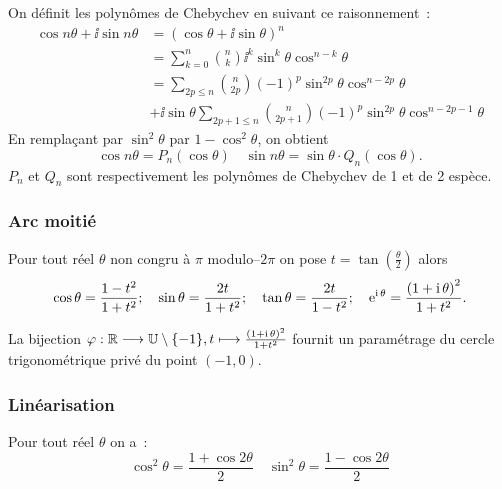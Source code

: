 \begin{defdef}
  On définit les polynômes de Chebychev en suivant ce raisonnement~:
  \begin{align*}
    \cos n \theta + \ii{}\sin n \theta &= {(\cos \theta + \ii{}\sin \theta)}^n\\
    &= \sum_{k = 0}^n \binom{n}{k} \ii^k \sin^k \theta \cos^{n-k} \theta\\
    &= \sum_{2p\leqslant
    n}\binom{n}{2p}{(-1)}^p\sin^{2p}\theta\cos^{n-2p}{\theta} \\
    &+ \ii{}\sin \theta \sum_{2p + 1\leqslant n}\binom{n}{2p + 1}{(-1)}^p
    \sin^{2p}{\theta}\cos^{n-2p-1}{\theta}
  \end{align*}
  En remplaçant par \(\sin^2 \theta\) par \(1-\cos^2 \theta\), on obtient
  \begin{equation}
    \cos{n\theta} = P_{n}(\cos{\theta})\quad\sin{n\theta} =
    \sin{\theta}\cdot{}Q_n{(\cos{\theta})}.
  \end{equation}
  \(P_n\) et \(Q_n\) sont respectivement les polynômes de Chebychev de
  1\iere{} et de 2\ieme{} espèce.
\end{defdef}

\subsubsection{Arc moitié}\label{subsubsec:arcmoitie}

Pour tout réel \(\theta\) non congru à \(\pi\) modulo--\(2\pi\) on pose \(t =
\tan \left( \frac{\theta}{2} \right)\) alors
\begin{equation}
  \cos \theta = \dfrac{1-t^2}{1 + t^2}; \quad  \sin \theta = \dfrac{2t}{1 +
  t^2}; \quad \tan \theta = \frac{2t}{1-t^2}; \quad \operatorname{e}^{\operatorname{i}{}\theta} = \frac{{(1
  + \operatorname{i}{}\theta)}^2}{1 + t^2}.
\end{equation}

La bijection \(\varphi:\mathbb{R} \longrightarrow{} \mathbb{U}\setminus \{-1\}, t \longmapsto{} \frac{{(1 + \operatorname{i}{}
\theta)}^2}{1 + t^2}\) fournit un paramétrage du cercle trigonométrique privé
du point \((-1,0)\).

\subsubsection{Linéarisation}\label{subsubsec:linearisation}

Pour tout réel \(\theta\) on a~:
\begin{equation}
  \cos^2{\theta} = \frac{1 + \cos{2\theta}}{2} \quad \sin^2{\theta} =
  \frac{1-\cos{2\theta}}{2}
\end{equation}

